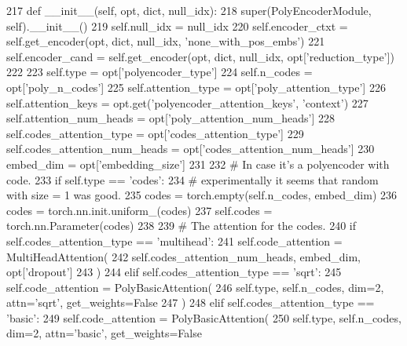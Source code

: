 \begin{DoxyCode}
217     \textcolor{keyword}{def }\_\_init\_\_(self, opt, dict, null\_idx):
218         super(PolyEncoderModule, self).\_\_init\_\_()
219         self.null\_idx = null\_idx
220         self.encoder\_ctxt = self.get\_encoder(opt, dict, null\_idx, \textcolor{stringliteral}{'none\_with\_pos\_embs'})
221         self.encoder\_cand = self.get\_encoder(opt, dict, null\_idx, opt[\textcolor{stringliteral}{'reduction\_type'}])
222 
223         self.type = opt[\textcolor{stringliteral}{'polyencoder\_type'}]
224         self.n\_codes = opt[\textcolor{stringliteral}{'poly\_n\_codes'}]
225         self.attention\_type = opt[\textcolor{stringliteral}{'poly\_attention\_type'}]
226         self.attention\_keys = opt.get(\textcolor{stringliteral}{'polyencoder\_attention\_keys'}, \textcolor{stringliteral}{'context'})
227         self.attention\_num\_heads = opt[\textcolor{stringliteral}{'poly\_attention\_num\_heads'}]
228         self.codes\_attention\_type = opt[\textcolor{stringliteral}{'codes\_attention\_type'}]
229         self.codes\_attention\_num\_heads = opt[\textcolor{stringliteral}{'codes\_attention\_num\_heads'}]
230         embed\_dim = opt[\textcolor{stringliteral}{'embedding\_size'}]
231 
232         \textcolor{comment}{# In case it's a polyencoder with code.}
233         \textcolor{keywordflow}{if} self.type == \textcolor{stringliteral}{'codes'}:
234             \textcolor{comment}{# experimentally it seems that random with size = 1 was good.}
235             codes = torch.empty(self.n\_codes, embed\_dim)
236             codes = torch.nn.init.uniform\_(codes)
237             self.codes = torch.nn.Parameter(codes)
238 
239             \textcolor{comment}{# The attention for the codes.}
240             \textcolor{keywordflow}{if} self.codes\_attention\_type == \textcolor{stringliteral}{'multihead'}:
241                 self.code\_attention = MultiHeadAttention(
242                     self.codes\_attention\_num\_heads, embed\_dim, opt[\textcolor{stringliteral}{'dropout'}]
243                 )
244             \textcolor{keywordflow}{elif} self.codes\_attention\_type == \textcolor{stringliteral}{'sqrt'}:
245                 self.code\_attention = PolyBasicAttention(
246                     self.type, self.n\_codes, dim=2, attn=\textcolor{stringliteral}{'sqrt'}, get\_weights=\textcolor{keyword}{False}
247                 )
248             \textcolor{keywordflow}{elif} self.codes\_attention\_type == \textcolor{stringliteral}{'basic'}:
249                 self.code\_attention = PolyBasicAttention(
250                     self.type, self.n\_codes, dim=2, attn=\textcolor{stringliteral}{'basic'}, get\_weights=\textcolor{keyword}{False}

\end{DoxyCode}
